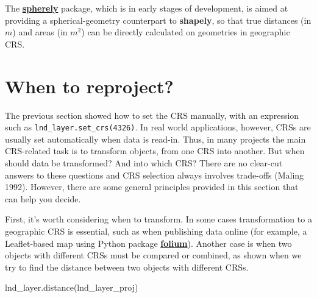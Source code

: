 \documentclass[
  letterpaper,
]{krantz}
\newenvironment{Shaded}{\begin{snugshade}}{\end{snugshade}}
\newcommand{\NormalTok}[1]{\textcolor[rgb]{0.00,0.23,0.31}{#1}}
\begin{document}
\begin{tcolorbox}[enhanced jigsaw, title=\textcolor{quarto-callout-note-color}{\faInfo}\hspace{0.5em}{Note}, coltitle=black, colbacktitle=quarto-callout-note-color!10!white, breakable, titlerule=0mm, colframe=quarto-callout-note-color-frame, opacitybacktitle=0.6, colback=white, bottomrule=.15mm, left=2mm, leftrule=.75mm, toprule=.15mm, toptitle=1mm, bottomtitle=1mm, arc=.35mm, opacityback=0, rightrule=.15mm]

The \href{https://github.com/benbovy/spherely}{\textbf{spherely}}
package, which is in early stages of development, is aimed at providing
a spherical-geometry counterpart to \textbf{shapely}, so that true
distances (in \(m\)) and areas (in \(m^2\)) can be directly calculated
on geometries in geographic CRS.

\end{tcolorbox}

\section{When to reproject?}\label{sec-when-to-reproject}

The previous section showed how to set the CRS manually, with an
expression such as \texttt{lnd\_layer.set\_crs(4326)}. In real world
applications, however, CRSs are usually set automatically when data is
read-in. Thus, in many projects the main CRS-related task is to
transform objects, from one CRS into another. But when should data be
transformed? And into which CRS? There are no clear-cut answers to these
questions and CRS selection always involves trade-offs (Maling 1992).
However, there are some general principles provided in this section that
can help you decide.

First, it's worth considering when to transform. In some cases
transformation to a geographic CRS is essential, such as when publishing
data online (for example, a Leaflet-based map using Python package
\href{https://python-visualization.github.io/folium/latest/}{\textbf{folium}}).
Another case is when two objects with different CRSs must be compared or
combined, as shown when we try to find the distance between two objects
with different CRSs.

\begin{Shaded}
\begin{Highlighting}[]
\NormalTok{lnd\_layer.distance(lnd\_layer\_proj)}
\end{Highlighting}
\end{Shaded}
\end{document}
